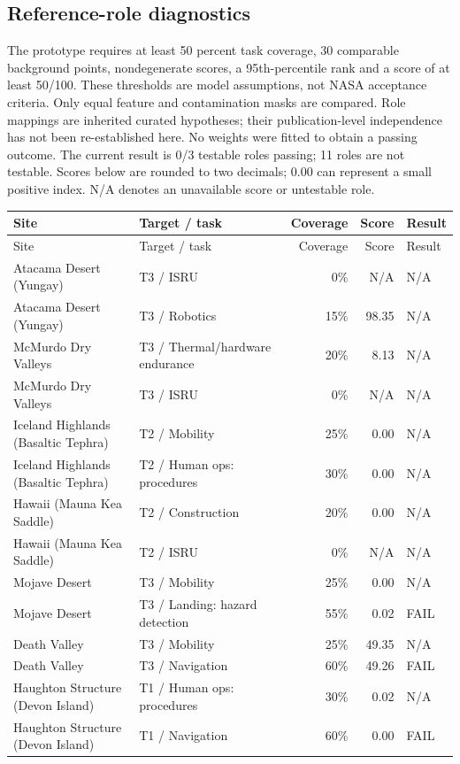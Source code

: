 \documentclass[10pt,a4paper]{article}
\begin{document}
\subsection{Reference-role diagnostics}
The prototype requires at least 50 percent task coverage, 30 comparable
background points, nondegenerate scores, a 95th-percentile rank and a score of
at least 50/100. These thresholds are model assumptions, not NASA acceptance
criteria. Only equal feature and contamination masks are compared. Role mappings
are inherited curated hypotheses; their publication-level independence has not
been re-established here. No weights were fitted to obtain a passing outcome.
The current result is 0/3 testable roles passing; 11 roles are not testable.
Scores below are rounded to two decimals; 0.00 can represent a small positive index. N/A denotes an unavailable score or untestable role.
\begin{longtable}{>{\raggedright\arraybackslash}p{3.5cm}>{\raggedright\arraybackslash}p{3.8cm}rrl}\toprule Site & Target / task & Coverage & Score & Result\\\midrule\endfirsthead\toprule Site & Target / task & Coverage & Score & Result\\\midrule\endhead
Atacama Desert (Yungay) & T3 / ISRU & 0\% & N/A & N/A \\
Atacama Desert (Yungay) & T3 / Robotics & 15\% & 98.35 & N/A \\
McMurdo Dry Valleys & T3 / Thermal/hardware endurance & 20\% & 8.13 & N/A \\
McMurdo Dry Valleys & T3 / ISRU & 0\% & N/A & N/A \\
Iceland Highlands (Basaltic Tephra) & T2 / Mobility & 25\% & 0.00 & N/A \\
Iceland Highlands (Basaltic Tephra) & T2 / Human ops: procedures & 30\% & 0.00 & N/A \\
Hawaii (Mauna Kea Saddle) & T2 / Construction & 20\% & 0.00 & N/A \\
Hawaii (Mauna Kea Saddle) & T2 / ISRU & 0\% & N/A & N/A \\
Mojave Desert & T3 / Mobility & 25\% & 0.00 & N/A \\
Mojave Desert & T3 / Landing: hazard detection & 55\% & 0.02 & FAIL \\
Death Valley & T3 / Mobility & 25\% & 49.35 & N/A \\
Death Valley & T3 / Navigation & 60\% & 49.26 & FAIL \\
Haughton Structure (Devon Island) & T1 / Human ops: procedures & 30\% & 0.02 & N/A \\
Haughton Structure (Devon Island) & T1 / Navigation & 60\% & 0.00 & FAIL \\
\bottomrule\end{longtable}
\end{document}
